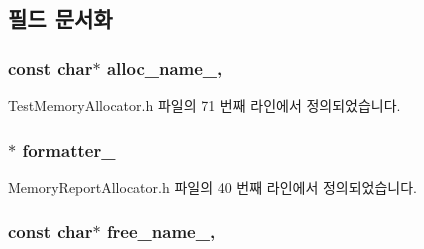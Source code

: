 \subsection{필드 문서화}
\subsubsection[{\texorpdfstring{alloc\+\_\+name\+\_\+}{alloc_name_}}]{\setlength{\rightskip}{0pt plus 5cm}const char$\ast$ alloc\+\_\+name\+\_\+\hspace{0.3cm}{\ttfamily [protected]}, {\ttfamily [inherited]}}\hypertarget{class_test_memory_allocator_ae5a98ff3b709da10db95a0ed03362548}{}\label{class_test_memory_allocator_ae5a98ff3b709da10db95a0ed03362548}


Test\+Memory\+Allocator.\+h 파일의 71 번째 라인에서 정의되었습니다.

\subsubsection[{\texorpdfstring{formatter\+\_\+}{formatter_}}]{$\ast$ formatter\+\_\+\hspace{0.3cm}{\ttfamily [protected]}}\hypertarget{class_memory_report_allocator_a09aec3af9ca6c3c27226a1aaaea13987}{}\label{class_memory_report_allocator_a09aec3af9ca6c3c27226a1aaaea13987}


Memory\+Report\+Allocator.\+h 파일의 40 번째 라인에서 정의되었습니다.

\subsubsection[{\texorpdfstring{free\+\_\+name\+\_\+}{free_name_}}]{\setlength{\rightskip}{0pt plus 5cm}const char$\ast$ free\+\_\+name\+\_\+\hspace{0.3cm}{\ttfamily [protected]}, {\ttfamily [inherited]}}\hypertarget{class_test_memory_allocator_a4f7ece205625129df190e624cccf9286}{}\label{class_test_memory_allocator_a4f7ece205625129df190e624cccf9286}


